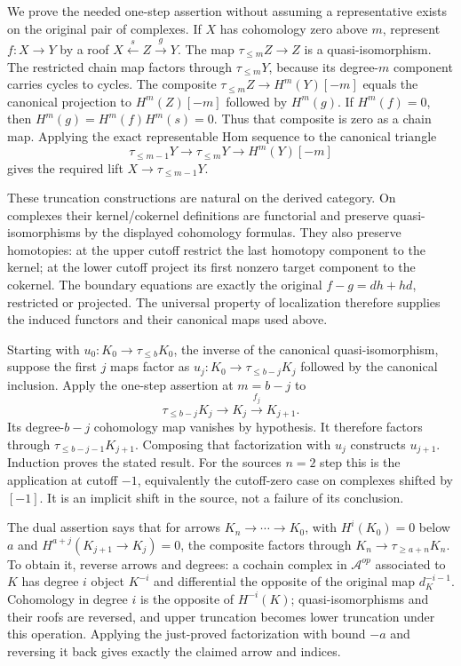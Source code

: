 \documentclass[11pt]{article}
\begin{document}
We prove the needed one-step assertion without assuming a representative exists on the original pair of complexes. If \(X\) has cohomology zero above \(m\),\allowbreak{} represent \(f:X\to Y\) by a roof \(X\xleftarrow{s}Z\xrightarrow{g}Y\). The map \(\tau_{\leq m}Z\to Z\) is a quasi-isomorphism. The restricted chain map factors through \(\tau_{\leq m}Y\),\allowbreak{} because its degree-\(m\) component carries cycles to cycles. The composite \(\tau_{\leq m}Z\to H^m(Y)[-m]\) equals the canonical projection to \(H^m(Z)[-m]\) followed by \(H^m(g)\). If \(H^m(f)=0\),\allowbreak{} then \(H^m(g)=H^m(f)H^m(s)=0\). Thus that composite is zero as a chain map. Applying the exact representable Hom sequence to the canonical triangle \[
\tau_{\leq m-1}Y\to\tau_{\leq m}Y\to H^m(Y)[-m]
\] gives the required lift \(X\to\tau_{\leq m-1}Y\).

These truncation constructions are natural on the derived category. On complexes their kernel/\allowbreak{}cokernel definitions are functorial and preserve quasi-isomorphisms by the displayed cohomology formulas. They also preserve homotopies:\allowbreak{} at the upper cutoff restrict the last homotopy component to the kernel; at the lower cutoff project its first nonzero target component to the cokernel. The boundary equations are exactly the original \(f-g=dh+hd\),\allowbreak{} restricted or projected. The universal property of localization therefore supplies the induced functors and their canonical maps used above.

Starting with \(u_0:K_0\to\tau_{\leq b}K_0\),\allowbreak{} the inverse of the canonical quasi-isomorphism,\allowbreak{} suppose the first \(j\) maps factor as \(u_j:K_0\to\tau_{\leq b-j}K_j\) followed by the canonical inclusion. Apply the one-step assertion at \(m=b-j\) to \[
\tau_{\leq b-j}K_j\longrightarrow K_j\xrightarrow{f_j}K_{j+1}.
\] Its degree-\(b-j\) cohomology map vanishes by hypothesis. It therefore factors through \(\tau_{\leq b-j-1}K_{j+1}\). Composing that factorization with \(u_j\) constructs \(u_{j+1}\). Induction proves the stated result. For the source\textquotesingle s \(n=2\) step this is the application at cutoff \(-1\),\allowbreak{} equivalently the cutoff-zero case on complexes shifted by \([-1]\). It is an implicit shift in the source,\allowbreak{} not a failure of its conclusion.

The dual assertion says that for arrows \(K_n\to\cdots\to K_0\),\allowbreak{} with \(H^i(K_0)=0\) below \(a\) and \(H^{a+j}(K_{j+1}\to K_j)=0\),\allowbreak{} the composite factors through \(K_n\to\tau_{\geq a+n}K_n\). To obtain it,\allowbreak{} reverse arrows and degrees:\allowbreak{} a cochain complex in \(\mathcal A^{op}\) associated to \(K\) has degree \(i\) object \(K^{-i}\) and differential the opposite of the original map \(d_K^{-i-1}\). Cohomology in degree \(i\) is the opposite of \(H^{-i}(K)\); quasi-isomorphisms and their roofs are reversed,\allowbreak{} and upper truncation becomes lower truncation under this operation. Applying the just-proved factorization with bound \(-a\) and reversing it back gives exactly the claimed arrow and indices.
\end{document}
